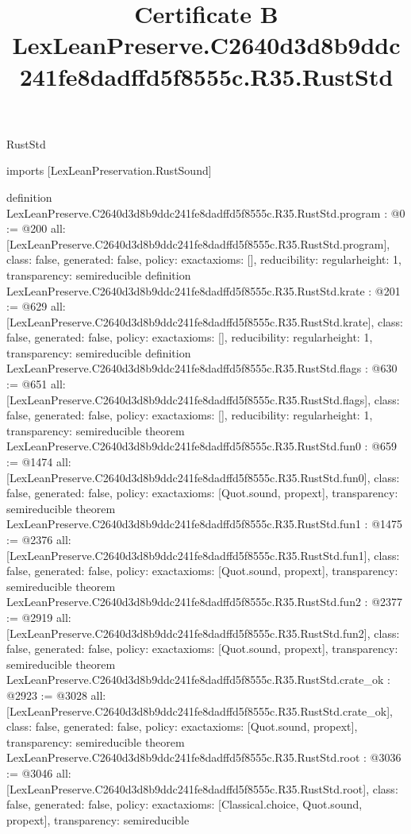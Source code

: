 \begin{lexlean}{RustStd}
\title{Certificate B LexLeanPreserve.C2640d3d8b9ddc241fe8dadffd5f8555c.R35.RustStd}
\begin{coremodule}
imports [LexLeanPreservation.RustSound]

definition LexLeanPreserve.C2640d3d8b9ddc241fe8dadffd5f8555c.R35.RustStd.program : @0 := @200 {
  all: [LexLeanPreserve.C2640d3d8b9ddc241fe8dadffd5f8555c.R35.RustStd.program],
  class: false,
  generated: false,
  policy: exact{axioms: []},
  reducibility: regular{height: 1},
  transparency: semireducible
}
definition LexLeanPreserve.C2640d3d8b9ddc241fe8dadffd5f8555c.R35.RustStd.krate : @201 := @629 {
  all: [LexLeanPreserve.C2640d3d8b9ddc241fe8dadffd5f8555c.R35.RustStd.krate],
  class: false,
  generated: false,
  policy: exact{axioms: []},
  reducibility: regular{height: 1},
  transparency: semireducible
}
definition LexLeanPreserve.C2640d3d8b9ddc241fe8dadffd5f8555c.R35.RustStd.flags : @630 := @651 {
  all: [LexLeanPreserve.C2640d3d8b9ddc241fe8dadffd5f8555c.R35.RustStd.flags],
  class: false,
  generated: false,
  policy: exact{axioms: []},
  reducibility: regular{height: 1},
  transparency: semireducible
}
theorem LexLeanPreserve.C2640d3d8b9ddc241fe8dadffd5f8555c.R35.RustStd.fun0 : @659 := @1474 {
  all: [LexLeanPreserve.C2640d3d8b9ddc241fe8dadffd5f8555c.R35.RustStd.fun0],
  class: false,
  generated: false,
  policy: exact{axioms: [Quot.sound, propext]},
  transparency: semireducible
}
theorem LexLeanPreserve.C2640d3d8b9ddc241fe8dadffd5f8555c.R35.RustStd.fun1 : @1475 := @2376 {
  all: [LexLeanPreserve.C2640d3d8b9ddc241fe8dadffd5f8555c.R35.RustStd.fun1],
  class: false,
  generated: false,
  policy: exact{axioms: [Quot.sound, propext]},
  transparency: semireducible
}
theorem LexLeanPreserve.C2640d3d8b9ddc241fe8dadffd5f8555c.R35.RustStd.fun2 : @2377 := @2919 {
  all: [LexLeanPreserve.C2640d3d8b9ddc241fe8dadffd5f8555c.R35.RustStd.fun2],
  class: false,
  generated: false,
  policy: exact{axioms: [Quot.sound, propext]},
  transparency: semireducible
}
theorem LexLeanPreserve.C2640d3d8b9ddc241fe8dadffd5f8555c.R35.RustStd.crate_ok : @2923 := @3028 {
  all: [LexLeanPreserve.C2640d3d8b9ddc241fe8dadffd5f8555c.R35.RustStd.crate_ok],
  class: false,
  generated: false,
  policy: exact{axioms: [Quot.sound, propext]},
  transparency: semireducible
}
theorem LexLeanPreserve.C2640d3d8b9ddc241fe8dadffd5f8555c.R35.RustStd.root : @3036 := @3046 {
  all: [LexLeanPreserve.C2640d3d8b9ddc241fe8dadffd5f8555c.R35.RustStd.root],
  class: false,
  generated: false,
  policy: exact{axioms: [Classical.choice, Quot.sound, propext]},
  transparency: semireducible
}


\end{coremodule}
\end{lexlean}

